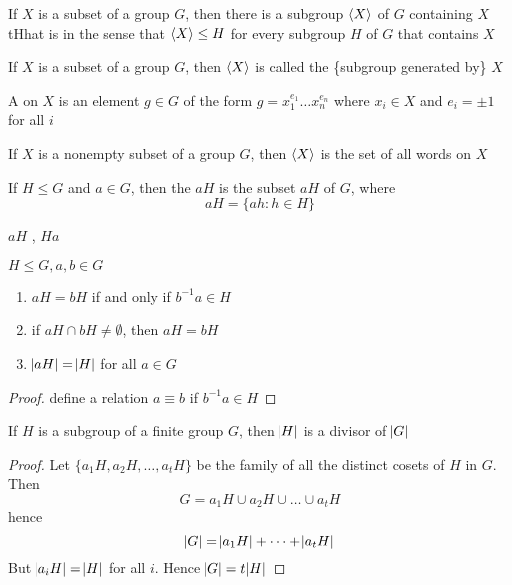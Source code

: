 \documentclass[11pt]{article}
\begin{document}
\begin{corollary}[]
If \(X\) is a subset of a group \(G\), then there is a subgroup \(\langle X\rangle\) of \(G\)
containing \(X\) tHhat is  in the sense that \(\langle X\rangle\le H\) for
every subgroup \(H\) 
of \(G\) that contains \(X\)
\end{corollary}


\begin{definition}[]
If \(X\) is a subset of a group \(G\), then \(\langle X\rangle\) is called the \tf\{subgroup
generated by\} \(X\)
\end{definition}

A  on \(X\) is an element \(g\in G\) of the form \(g=x_1^{e_1}\dots
   x_n^{e_n}\) where \(x_i\in X\) and \(e_i=\pm 1\) for all \(i\)

\begin{proposition}[]
If \(X\) is a nonempty subset of a group \(G\), then \(\langle X\rangle\) is the set of all
words on \(X\)
\end{proposition}


\begin{definition}[]
If \(H\le G\) and \(a\in G\), then the  \(aH\) is the subset \(aH\) of \(G\),
where
\begin{equation*}
aH=\{ah:h\in H\}
\end{equation*}
\end{definition}
\(aH\) , \(Ha\) 

\begin{lemma}[]
\(H\le G,a,b\in G\)
\begin{enumerate}
\item \(aH=bH\) if and only if \(b^{-1}a\in H\)
\item if \(aH\cap bH\neq\emptyset\), then \(aH=bH\)
\item \(\abs{aH}=\abs{H}\) for all \(a\in G\)
\end{enumerate}
\end{lemma}
\begin{proof}
define a relation \(a\equiv b\) if \(b^{-1}a\in H\)
\end{proof}


\begin{theorem}
If \(H\) is a subgroup of a finite group \(G\), then \(\abs{H}\) is a divisor of \(\abs{G}\)
\end{theorem}

\begin{proof}
Let \(\{a_1H,a_2H,\dots,a_tH\}\) be the family of all the distinct cosets of
\(H\) in \(G\). Then
\begin{equation*}
G=a_1H\cup a_2H\cup\dots\cup a_tH
\end{equation*}
hence
\begin{equation*}
\abs{G}=\abs{a_1H}+\dots+\abs{a_tH}
\end{equation*}
But \(\abs{a_iH}=\abs{H}\) for all \(i\). Hence \(\abs{G}=t\abs{H}\)
\end{proof}
\end{document}
